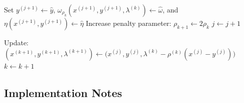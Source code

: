 \documentclass[11pt]{article}
\begin{document}
\begin{algorithm2e}[H]
{{{      Set $y^{(j+1)} \gets \hat{y}$,
      $\omega_{\rho_k}(x^{(j+1)}, y^{(j+1)}, \lambda^{(k)}) \gets \hat{\omega}$,
      and $\eta(x^{(j+1)}, y^{(j+1)}) \gets \hat{\eta}$\;
      Increase penalty parameter: $\rho_{k+1} \leftarrow 2\rho_k$\;
    } %
    $j \gets j+1$\;
  } %

  Update:\ $(x^{(k+1)}, y^{(k+1)}, \lambda^{(k+1)}) \leftarrow
    \bigl(x^{(j)}, y^{(j)}, \lambda^{(k)} - \rho^{(k)}\left(x^{(j)}-y^{(j)}\right)\bigr)$\;
  $k \leftarrow k + 1$\;
} %
\end{algorithm2e}

\subsection{Implementation Notes}
\end{document}
